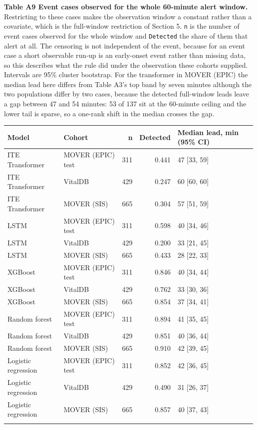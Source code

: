 \begin{minipage}{\linewidth}
\textbf{Table A9 \textbar{} Event cases observed for the whole 60-minute alert window.} Restricting to these
cases makes the observation window a constant rather than a covariate, which is the
full-window restriction of Section 5. \texttt{n} is the number of event cases observed for the
whole window and \texttt{Detected} the share of them that alert at all.
The censoring is not independent of the event, because for an event case a short
observable run-up is an early-onset event rather than missing data, so this describes what the
rule did under the observation these cohorts supplied. Intervals are 95\% cluster bootstrap.
For the transformer in MOVER (EPIC) the median lead here differs from Table A3's top band by
seven minutes although the two populations differ by two cases, because the detected
full-window leads leave a gap between 47 and 54 minutes: 53 of 137 sit at the 60-minute
ceiling and the lower tail is sparse, so a one-rank shift in the median crosses the gap.

\vspace{0.5em}
\centering\footnotesize
\begin{tabular}{@{}llrrl@{}}
\toprule\noalign{}
Model & Cohort & n & Detected & Median lead, min (95\% CI) \\
\midrule\noalign{}
\bottomrule\noalign{}
ITE Transformer & MOVER (EPIC) test & 311 & 0.441 & 47 {[}33, 59{]} \\
ITE Transformer & VitalDB & 429 & 0.247 & 60 {[}60, 60{]} \\
ITE Transformer & MOVER (SIS) & 665 & 0.304 & 57 {[}51, 59{]} \\
LSTM & MOVER (EPIC) test & 311 & 0.598 & 40 {[}34, 46{]} \\
LSTM & VitalDB & 429 & 0.200 & 33 {[}21, 45{]} \\
LSTM & MOVER (SIS) & 665 & 0.433 & 28 {[}22, 33{]} \\
XGBoost & MOVER (EPIC) test & 311 & 0.846 & 40 {[}34, 44{]} \\
XGBoost & VitalDB & 429 & 0.762 & 33 {[}30, 36{]} \\
XGBoost & MOVER (SIS) & 665 & 0.854 & 37 {[}34, 41{]} \\
Random forest & MOVER (EPIC) test & 311 & 0.894 & 41 {[}35, 45{]} \\
Random forest & VitalDB & 429 & 0.851 & 40 {[}36, 44{]} \\
Random forest & MOVER (SIS) & 665 & 0.910 & 42 {[}39, 45{]} \\
Logistic regression & MOVER (EPIC) test & 311 & 0.852 & 42 {[}36, 45{]} \\
Logistic regression & VitalDB & 429 & 0.490 & 31 {[}26, 37{]} \\
Logistic regression & MOVER (SIS) & 665 & 0.857 & 40 {[}37, 43{]} \\
\bottomrule\noalign{}
\end{tabular}
\end{minipage}


